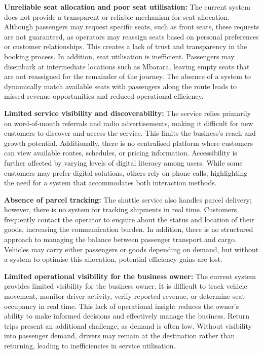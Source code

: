 \textbf{Unreliable seat allocation and poor seat utilisation:} The
current system does not provide a transparent or reliable mechanism for seat
allocation. Although passengers may request specific seats, such as front seats,
these requests are not guaranteed, as operators may reassign seats based on
personal preferences or customer relationships. This creates a lack of trust and
transparency in the booking process. In addition, seat utilisation is
inefficient. Passengers may disembark at intermediate locations such as Mbarara,
leaving empty seats that are not reassigned for the remainder of the journey.
The absence of a system to dynamically match available seats with passengers
along the route leads to missed revenue opportunities and reduced operational
efficiency.


\textbf{Limited service visibility and discoverability:} The
service relies primarily on word-of-mouth referrals and radio advertisements,
making it difficult for new customers to discover and access the service. This
limits the business's reach and growth potential. Additionally, there is no
centralised platform where customers can view available routes, schedules, or
pricing information. Accessibility is further affected by varying levels of
digital literacy among users. While some customers may prefer digital solutions,
others rely on phone calls, highlighting the need for a system that accommodates
both interaction methods.


\textbf{Absence of parcel tracking:} The shuttle service also
handles parcel delivery; however, there is no system for tracking shipments in
real time. Customers frequently contact the operator to enquire about the status
and location of their goods, increasing the communication burden. In addition,
there is no structured approach to managing the balance between passenger
transport and cargo. Vehicles may carry either passengers or goods depending on
demand, but without a system to optimise this allocation, potential efficiency
gains are lost.


\textbf{Limited operational visibility for the business owner:}
The current system provides limited visibility for the business owner. It is
difficult to track vehicle movement, monitor driver activity, verify reported
revenue, or determine seat occupancy in real time. This lack of operational
insight reduces the owner's ability to make informed decisions and effectively
manage the business. Return trips present an additional challenge, as demand is
often low. Without visibility into passenger demand, drivers may remain at the
destination rather than returning, leading to inefficiencies in service
utilisation.


